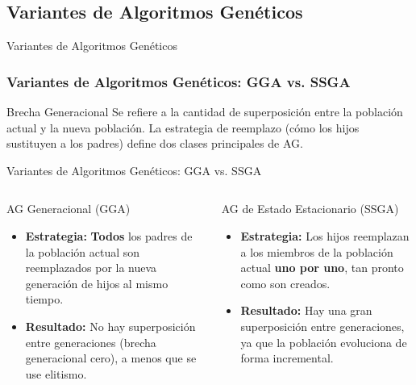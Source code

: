 \documentclass[aspectratio=169,xcolor=dvipsnames]{beamer}
\begin{document}
\subsection{Variantes de Algoritmos Genéticos}

\begin{frame}{Variantes de Algoritmos Genéticos}
    \frametitle{Variantes de Algoritmos Genéticos: GGA vs. SSGA}
    \begin{block}{Brecha Generacional}
    Se refiere a la cantidad de superposición entre la población actual y la nueva población. La estrategia de reemplazo (cómo los hijos sustituyen a los padres) define dos clases principales de AG.
    \end{block}
\end{frame}

\begin{frame}{Variantes de Algoritmos Genéticos: GGA vs. SSGA}
    \begin{columns}[t]
            \begin{alertblock}{AG Generacional (GGA)}
                \begin{itemize}
                    \item \textbf{Estrategia:} \textbf{Todos} los padres de la población actual son reemplazados por la nueva generación de hijos al mismo tiempo.
                    \item \textbf{Resultado:} No hay superposición entre generaciones (brecha generacional cero), a menos que se use elitismo.
                \end{itemize}
            \end{alertblock}

            \begin{block}{AG de Estado Estacionario (SSGA)}
                 \begin{itemize}
                    \item \textbf{Estrategia:} Los hijos reemplazan a los miembros de la población actual \textbf{uno por uno}, tan pronto como son creados.
                    \item \textbf{Resultado:} Hay una gran superposición entre generaciones, ya que la población evoluciona de forma incremental.
                \end{itemize}
            \end{block}
    \end{columns}
\end{frame}
\end{document}
